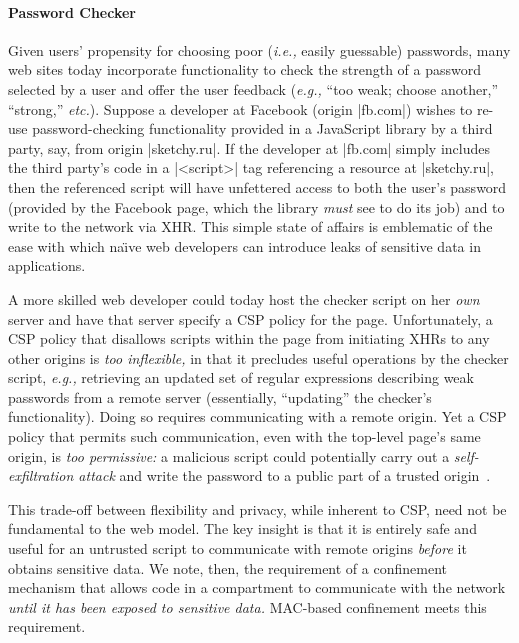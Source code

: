 \paragraph{Password Checker} Given users' propensity for choosing poor
(\emph{i.e.,} easily guessable) passwords, many web sites today incorporate
functionality to check the strength of a password selected by a user
and offer the user feedback (\emph{e.g.,} ``too weak; choose another,''
``strong,'' \emph{etc.}). Suppose a developer at Facebook (origin
\js|fb.com|) wishes to re-use password-checking functionality provided
in a JavaScript library by a third party, say, from origin
\js|sketchy.ru|. If the developer at \js|fb.com| simply includes the
third party's code in a \js|<script>| tag referencing a resource at
\js|sketchy.ru|, then the referenced script will have unfettered
access to both the user's password (provided by the Facebook page,
which the library {\em must} see to do its job) and to write to the
network via XHR\@. This simple state of affairs is emblematic of the
ease with which na\"{\i}ve web developers can introduce leaks of
sensitive data in applications.

A more skilled web developer could today host the checker script on
her {\em own} server and have that server specify a CSP policy for the
page.
%
Unfortunately, a CSP policy that disallows scripts within the page
from initiating XHRs to any other origins is \emph{too inflexible,} in
that it precludes useful operations by the checker script, \emph{e.g.,}
retrieving an updated set of regular expressions describing weak
passwords from a remote server (essentially, ``updating'' the
checker's functionality). Doing so requires communicating with a
remote origin.
%
Yet a CSP policy that permits such communication, even with the
top-level page's same origin, is \emph{too permissive:} a malicious
script could potentially carry out a \emph{self-exfiltration attack}
and write the password to a public part of a trusted
origin~\cite{Yip:2009:PBS, selfex}.

This trade-off between flexibility and privacy, while inherent to
CSP, need not be fundamental to the web model.
%
The key insight is that it is entirely safe and useful for an untrusted script to
communicate with remote origins {\em before} it obtains sensitive
data. We note, then, the requirement of a confinement mechanism that
allows code in a compartment to communicate with the network {\em
  until it has been exposed to sensitive data.} MAC-based confinement
meets this requirement.

